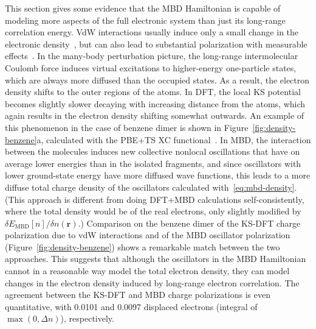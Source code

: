 This section gives some evidence that the MBD Hamiltonian is capable of modeling more aspects of the full electronic system than just its long-range correlation energy.
VdW interactions usually induce only a small change in the electronic density~\cite{ThonhauserPRB07,VydrovJCP08}, but can also lead to substantial polarization with measurable effects~\cite{FerriPRL15}.
In the many-body perturbation picture, the long-range intermolecular Coulomb force induces virtual excitations to higher-energy one-particle states, which are always more diffused than the occupied states.
As a result, the electron density shifts to the outer regions of the atoms.
In DFT, the local KS potential becomes slightly slower decaying with increasing distance from the atoms, which again results in the electron density shifting somewhat outwards.
An example of this phenomenon in the case of benzene dimer is shown in Figure~\ref{fig:density-benzene}a, calculated with the PBE+TS XC functional~\cite{FerriPRL15}.
In MBD, the interaction between the molecules induces new collective nonlocal oscillations that have on average lower energies than in the isolated fragments, and since oscillators with lower ground-state energy have more diffused wave functions, this leads to a more diffuse total charge density of the oscillators calculated with~\eqref{eq:mbd-density}.
(This approach is different from doing DFT+MBD calculations self-consistently, where the total density would be of the real electrons, only slightly modified by $\delta E_\text{MBD}[n]/\delta n(\mathbf r)$.)
Comparison on the benzene dimer of the KS-DFT charge polarization due to vdW interactions and of the MBD oscillator polarization (Figure~\ref{fig:density-benzene}) shows a remarkable match between the two approaches.
This suggests that although the oscillators in the MBD Hamiltonian cannot in a reasonable way model the total electron density, they can model changes in the electron density induced by long-range electron correlation.
The agreement between the KS-DFT and MBD charge polarizations is even quantitative, with 0.0101 and 0.0097 displaced electrons (integral of $\max(0,\Delta n)$), respectively.

